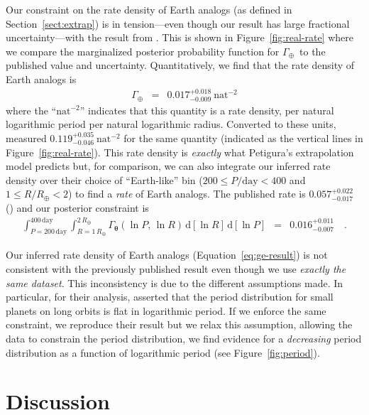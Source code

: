 \documentclass[12pt,preprint]{aastex}
\newcommand{\figref}[1]{\ref{fig:#1}}
\newcommand{\Fig}[1]{Figure~\figref{#1}}
\newcommand{\fig}[1]{\Fig{#1}}
\newcommand{\eqalt}[1]{Equation~\ref{eq:#1}}
\newcommand{\eqlabel}[1]{\label{eq:#1}}
\newcommand{\Sect}[1]{Section~\ref{sect:#1}}
\newcommand{\sect}[1]{\Sect{#1}}
\newcommand{\dd}{\ensuremath{\,\mathrm{d}}}
\newcommand{\bvec}[1]{\ensuremath{\boldsymbol{#1}}}
\newcommand{\densityunit}{{\ensuremath{\mathrm{nat}^{-2}}}}
\newcommand{\rate}{\ensuremath{\Gamma}}
\newcommand{\ratepar}{{\ensuremath{\theta}}}
\newcommand{\ratepars}{{\ensuremath{\bvec{\ratepar}}}}
\newcommand{\radius}{\ensuremath{R}}
\newcommand{\period}{\ensuremath{P}}
\newcommand{\gammaearth}{{\ensuremath{\rate_\oplus}}}
\begin{document}
Our constraint on the rate density of Earth analogs (as defined in
\sect{extrap}) is in tension---even though our result has large fractional
uncertainty---with the result from \citet{petigura}.
This is shown in \fig{real-rate} where we compare the marginalized posterior
probability function for \gammaearth\ to the published value and uncertainty.
Quantitatively, we find that the rate density of Earth analogs is
\begin{eqnarray}\eqlabel{ge-result}
\gammaearth &=& 0.017^{+0.018}_{-0.009}~\densityunit
\end{eqnarray}
where the ``\densityunit'' indicates that this quantity is a rate density, per
natural logarithmic period per natural logarithmic radius.
Converted to these units, \citet{petigura} measured
$0.119_{-0.046}^{+0.035}~\densityunit$ for the same quantity (indicated as the
vertical lines in \fig{real-rate}).
This rate density is \emph{exactly} what Petigura's extrapolation model
predicts but, for comparison, we can also integrate our inferred rate density
over their choice of ``Earth-like'' bin ($200 \le \period/\mathrm{day} < 400$
and $1 \le \radius/\radius_\oplus < 2$) to find a \emph{rate} of
Earth analogs.
The published rate is $0.057_{-0.017}^{+0.022}$ (\citealt{petigura}) and our
posterior constraint is
\begin{eqnarray}
\int_{\period=200\,\mathrm{day}}^{400\,\mathrm{day}}
\int_{\radius=1\,\radius_\oplus}^{2\,\radius_\oplus}
\rate_\ratepars (\ln\period,\,\ln\radius)
\dd[\ln\radius]
\dd[\ln\period]
&=&
0.016_{-0.007}^{+0.011}
\quad.
\end{eqnarray}

Our inferred rate density of Earth analogs (\eqalt{ge-result}) is not
consistent with the previously published result even though we use
\emph{exactly the same dataset}.
This inconsistency is due to the different assumptions made.
In particular, for their analysis, \citet{petigura} asserted that the period
distribution for small planets on long orbits is flat in logarithmic period.
If we enforce the same constraint, we reproduce their result but we relax this
assumption, allowing the data to constrain the period distribution, we find
evidence for a \emph{decreasing} period distribution as a function of
logarithmic period (see \fig{period}).

\section{Discussion}
\end{document}
